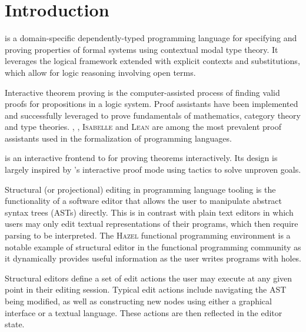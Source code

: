 \chapter{Introduction}



\Beluga is a domain-specific dependently-typed programming language for specifying and proving properties of formal systems using contextual modal type theory.
It leverages the logical framework \LF extended with explicit contexts and substitutions, which allow for logic reasoning involving open terms.


Interactive theorem proving is the computer-assisted process of finding valid proofs for propositions in a logic system.
Proof assistants have been implemented and successfully leveraged to prove fundamentals of mathematics, category theory and type theories.
\Agda, \Coq, \textsc{Isabelle} and \textsc{Lean} are among the most prevalent proof assistants used in the formalization of programming languages.

\Harpoon is an interactive frontend to \Beluga for proving theorems interactively.
Its design is largely inspired by \Coq's interactive proof mode using tactics to solve unproven goals.

Structural (or projectional) editing in programming language tooling is the functionality of a software editor that allows the user to manipulate abstract syntax trees (ASTs) directly.
This is in contrast with plain text editors in which users may only edit textual representations of their programs, which then require parsing to be interpreted.
The \textsc{Hazel} functional programming environment is a notable example of structural editor in the functional programming community as it dynamically provides useful information as the user writes programs with holes.

Structural editors define a set of edit actions the user may execute at any given point in their editing session.
Typical edit actions include navigating the AST being modified, as well as constructing new nodes using either a graphical interface or a textual language.
These actions are then reflected in the editor state.

